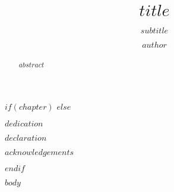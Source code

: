 \documentclass[
$if(chapter)$
  chapter,
$endif$
$if(print)$
  print,
$endif$
$if(lineno)$
  lineno,
$endif$
$if(index)$
  index,
$endif$
$if(papersize)$
  $papersize$,
$endif$
$if(page-layout)$
  $page-layout$,
$endif$
$if(page-style)$
  $page-style$,
$endif$
$if(flushleft)$
  flushleft,
$endif$
$if(geometry)$
  custommargin,
$endif$
$if(fontsize)$
  $fontsize$,
$endif$
$if(fontfamily)$
  $fontfamily$,
$endif$
]{PhDThesisPSnPDF}
\title{$title$}
\subtitle{$subtitle$}
\author{$author$}
\begin{document}
\maketitle

\frontmatter

$if(chapter)$
$else$
\begin{dedication}
  $dedication$
\end{dedication}

\begin{declaration}
  $declaration$
\end{declaration}

\begin{acknowledgements}
  $acknowledgements$
\end{acknowledgements}

\begin{abstract}
  $abstract$
\end{abstract}
$endif$

\tableofcontents

\listoffigures

\listoftables

\printnomenclature

\mainmatter

$body$

\printthesisindex
\end{document}
